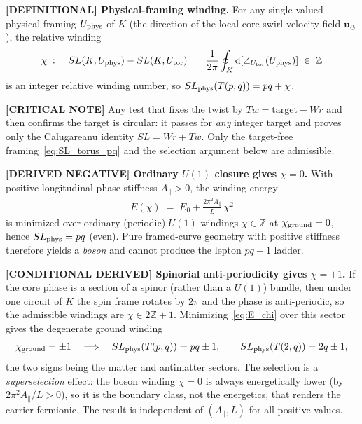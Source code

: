 \documentclass[11pt]{article}
\theoremstyle{definition}
\theoremstyle{plain}
\theoremstyle{remark}
\newcommand{\uswirl}{\mathbf{u}_{\!\boldsymbol{\circlearrowleft}}}
\begin{document}
        \textbf{[DEFINITIONAL] Physical-framing winding.}
        For any single-valued physical framing $U_{\rm phys}$ of $K$ (the direction of the local core
        swirl-velocity field $\uswirl$), the relative winding
        \begin{align}
            \chi \;:=\; SL(K,U_{\rm phys})-SL(K,U_{\rm tor})
                  \;=\; \frac{1}{2\pi}\oint_K \mathrm{d}\!\left[\angle_{U_{\rm tor}}(U_{\rm phys})\right]
                  \;\in\; \mathbb{Z}
            \label{eq:chi_def}
        \end{align}
        is an integer relative winding number, so $SL_{\rm phys}(T(p,q))=pq+\chi$.

        \textbf{[CRITICAL NOTE]} Any test that fixes the twist by $Tw=\mathrm{target}-Wr$ and
        then confirms the target is circular: it passes for \emph{any} integer target and
        proves only the Calugareanu identity $SL=Wr+Tw$. Only the target-free
        framing~\eqref{eq:SL_torus_pq} and the selection argument below are admissible.

        \textbf{[DERIVED NEGATIVE] Ordinary $U(1)$ closure gives $\chi=0$.}
        With positive longitudinal phase stiffness $A_\parallel>0$, the winding energy
        \begin{align}
            E(\chi)\;=\;E_0+\frac{2\pi^2 A_\parallel}{L}\,\chi^2
            \label{eq:E_chi}
        \end{align}
        is minimized over ordinary (periodic) $U(1)$ windings $\chi\in\mathbb{Z}$ at
        $\chi_{\rm ground}=0$, hence $SL_{\rm phys}=pq$ (even). Pure framed-curve geometry with
        positive stiffness therefore yields a \emph{boson} and cannot produce the lepton
        $pq+1$ ladder.

        \textbf{[CONDITIONAL DERIVED] Spinorial anti-periodicity gives $\chi=\pm1$.}
        If the core phase is a section of a spinor (rather than a $U(1)$) bundle, then under one
        circuit of $K$ the spin frame rotates by $2\pi$ and the phase is anti-periodic, so the
        admissible windings are $\chi\in 2\mathbb{Z}+1$. Minimizing~\eqref{eq:E_chi} over this
        sector gives the degenerate ground winding
        \begin{align}
            \chi_{\rm ground}=\pm1 \quad\Longrightarrow\quad
            SL_{\rm phys}(T(p,q))=pq\pm1,
            \qquad SL_{\rm phys}(T(2,q))=2q\pm1,
            \label{eq:SL_phys_pq1}
        \end{align}
        the two signs being the matter and antimatter sectors. The selection is a
        \emph{superselection} effect: the boson winding $\chi=0$ is always energetically lower
        (by $2\pi^2 A_\parallel/L>0$), so it is the boundary class, not the energetics, that
        renders the carrier fermionic. The result is independent of $(A_\parallel,L)$ for all
        positive values.
\end{document}
